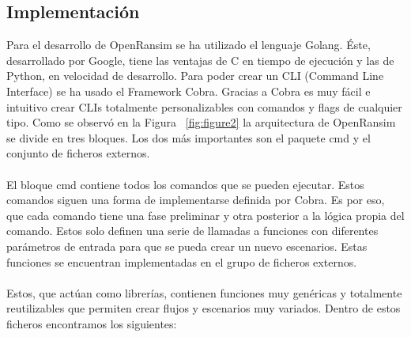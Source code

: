 \documentclass[a4paper,12pt]{article}
\begin{document}
\subsection{Implementación}
Para el desarrollo de OpenRansim se ha utilizado el lenguaje Golang. Éste, desarrollado por Google, tiene las ventajas de C en tiempo de ejecución y las de Python, en velocidad de desarrollo. Para poder crear un CLI (Command Line Interface) se ha usado el Framework Cobra. Gracias a Cobra es muy fácil e intuitivo crear CLIs totalmente personalizables con comandos y flags de cualquier tipo. Como se observó en la Figura ~\ref{fig:figure2} la arquitectura de OpenRansim se divide en tres bloques. Los dos más importantes son el paquete cmd y el conjunto de ficheros externos.\\\\
El bloque cmd contiene todos los comandos que se pueden ejecutar. Estos comandos siguen una forma de implementarse definida por Cobra. Es por eso, que cada comando tiene una fase preliminar y otra posterior a la lógica propia del comando. Estos solo definen una serie de llamadas a funciones con diferentes parámetros de entrada para que se pueda crear un nuevo escenarios. Estas funciones se encuentran implementadas en el grupo de ficheros externos.\\\\
Estos, que actúan como librerías, contienen funciones muy genéricas y totalmente reutilizables que permiten crear flujos y escenarios muy variados. Dentro de estos ficheros encontramos los siguientes:
\end{document}
